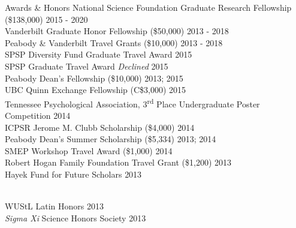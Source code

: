 \documentclass {resume}
\begin{document}
\begin{rSection}{\textrm{Awards \& Honors}}
National Science Foundation Graduate Research Fellowship (\$138,000) \hfill{2015 - 2020}\smallskip\\
Vanderbilt Graduate Honor Fellowship (\$50,000)	\hfill  {2013 - 2018}\smallskip\\	
Peabody \& Vanderbilt Travel Grants (\$10,000)      \hfill  {2013 - 2018}\smallskip\\
SPSP Diversity Fund Graduate Travel Award %
\hfill{2015}\smallskip\\
SPSP Graduate Travel Award %
{\small \textit{Declined}} \hfill{2015}\smallskip\\
Peabody Dean's Fellowship (\$10,000)					\hfill  {2013; 2015}\smallskip\\
UBC Quinn Exchange Fellowship (C\$3,000) \hfill{2015}\smallskip\\
Tennessee Psychological Association, 3\textsuperscript{rd} Place Undergraduate Poster Competition \hfill{2014}\smallskip\\
ICPSR Jerome M. Clubb Scholarship (\$4,000) \hfill{2014}\smallskip\\
Peabody Dean's Summer Scholarship (\$5,334)			    \hfill  {2013; 2014}\smallskip\\	
SMEP Workshop Travel Award (\$1,000) \hfill{2014}\smallskip\\
Robert Hogan Family Foundation Travel Grant (\$1,200) 	\hfill  {2013}\smallskip\\
Hayek Fund for Future Scholars                      \hfill  {2013}\vspace*{2pt}
\begin{minipage}{\linewidth}\smallskip\\ WUStL Latin Honors \hfill  {2013}\smallskip\\
\textit{Sigma Xi} Science Honors Society                    			\hfill  {2013}\end{minipage}%
\end{rSection}
\end{document}

